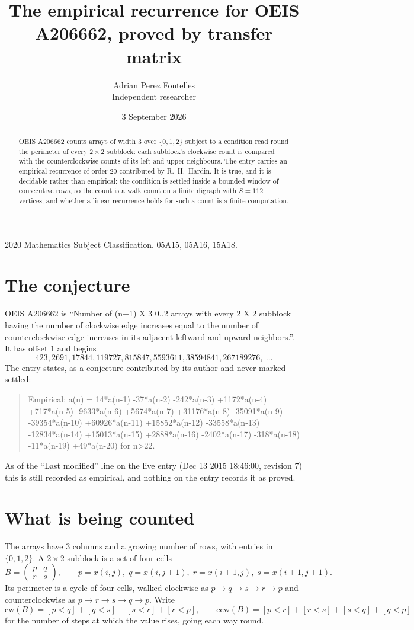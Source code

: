 \documentclass[11pt,a4paper]{article}
\title{The empirical recurrence for OEIS A206662, proved by transfer matrix}
\author{Adrian Perez Fontelles\\ \small Independent researcher}
\date{3 September 2026}
\theoremstyle{plain}
\theoremstyle{definition}
\begin{document}
\maketitle

\begin{abstract}
OEIS A206662 counts arrays of width $3$ over $\{0,1,2\}$ subject to a condition read round the
perimeter of every $2\times2$ subblock: each subblock's clockwise count is compared with the counterclockwise counts of its left and upper neighbours. The entry carries an empirical recurrence of
order $20$ contributed by R.~H.~Hardin. It is true, and it is decidable rather than
empirical: the condition is settled inside a bounded window of consecutive rows, so the
count is a walk count on a finite digraph with $S=112$ vertices, and whether a linear
recurrence holds for such a count is a finite computation.
\end{abstract}

\noindent\small 2020 Mathematics Subject Classification. 05A15, 05A16, 15A18.\normalsize

\section{The conjecture}

OEIS A206662 is ``Number of (n+1) X 3 0..2 arrays with every 2 X 2 subblock having the number of clockwise edge increases equal to the number of counterclockwise edge increases in its adjacent leftward and upward neighbors.''. It has offset $1$ and begins
\[
423, 2691, 17844, 119727, 815847, 5593611, 38594841, 267189276,\ \dots
\]
The entry states, as a conjecture contributed by its author and never marked settled:
\begin{quote}
Empirical: a(n) = 14*a(n-1) -37*a(n-2) -242*a(n-3) +1172*a(n-4) +717*a(n-5) -9633*a(n-6) +5674*a(n-7) +31176*a(n-8) -35091*a(n-9) -39354*a(n-10) +60926*a(n-11) +15852*a(n-12) -33558*a(n-13) -12834*a(n-14) +15013*a(n-15) +2888*a(n-16) -2402*a(n-17) -318*a(n-18) -11*a(n-19) +49*a(n-20) for n>22.
\end{quote}
As of the ``Last modified'' line on the live entry (Dec 13 2015 18:46:00, revision 7) this is still
recorded as empirical, and nothing on the entry records it as proved.

\section{What is being counted}

The arrays have $3$ columns and a growing number of rows, with entries in $\{0,1,2\}$. A
$2\times2$ subblock is a set of four cells
\[
B=\begin{pmatrix} p & q \\ r & s \end{pmatrix},
\qquad p=x(i,j),\; q=x(i,j+1),\; r=x(i+1,j),\; s=x(i+1,j+1).
\]
Its perimeter is a cycle of four cells, walked clockwise as $p\to q\to s\to r\to p$ and
counterclockwise as $p\to r\to s\to q\to p$. Write
\[
\mathrm{cw}(B)=[p<q]+[q<s]+[s<r]+[r<p],\qquad
\mathrm{ccw}(B)=[p<r]+[r<s]+[s<q]+[q<p]
\]
for the number of steps at which the value rises, going each way round.
\end{document}
